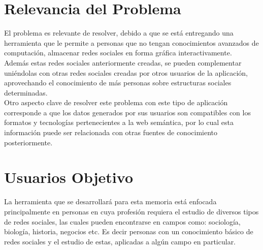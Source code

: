 \section{Relevancia del Problema} %
\label{sec:relevancia_del_problema}

El problema es relevante de resolver, debido a que se está entregando una herramienta que le permite a personas que no tengan conocimientos avanzados de computación, almacenar redes sociales en forma gráfica interactivamente.\\

Además estas redes sociales anteriormente creadas, se pueden complementar uniéndolas con otras redes sociales creadas por otros usuarios de la aplicación, aprovechando el conocimiento de más personas sobre estructuras sociales determinadas.\\

Otro aspecto clave de resolver este problema con este tipo de aplicación corresponde a que los datos generados por sus usuarios son compatibles con los formatos y tecnologías pertenecientes a la web semántica, por lo cual esta información puede ser relacionada con otras fuentes de conocimiento posteriormente.



% 
\section{Usuarios Objetivo} %
\label{sec:usuarios_objetivo}

La herramienta que se desarrollará para esta memoria está enfocada principalmente en personas en cuya profesión requiera el estudio de diversos tipos de redes sociales, las cuales pueden encontrarse en campos como: sociología, biología, historia, negocios etc. Es decir personas con un conocimiento básico de redes sociales y el estudio de estas, aplicadas a algún campo en particular.

